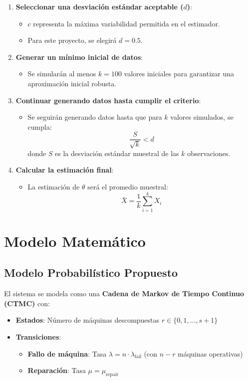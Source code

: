 \documentclass[a4paper, 12pt]{article}
\begin{document}
\begin{enumerate}
    \item \textbf{Seleccionar una desviación estándar aceptable (\(d\))}:
    \begin{itemize}
        \item \(c\) representa la máxima variabilidad permitida en el estimador.
        \item Para este proyecto, se elegirá \(d = 0.5\). 
    \end{itemize}
    
    \item \textbf{Generar un mínimo inicial de datos}:
    \begin{itemize}
        \item Se simularán al menos \(k = 100\) valores iniciales para garantizar una aproximación inicial robusta.
    \end{itemize}
    
    \item \textbf{Continuar generando datos hasta cumplir el criterio}:
    \begin{itemize}
        \item Se seguirán generando datos hasta que para \(k\) valores simulados, se cumpla:
        \[
        \frac{S}{\sqrt{k}} < d
        \]
        donde \(S\) es la desviación estándar muestral de las \(k\) observaciones.
    \end{itemize}
    
    \item \textbf{Calcular la estimación final}:
    \begin{itemize}
        \item La estimación de \(\theta\) será el promedio muestral:
        \[
        \bar{X} = \frac{1}{k} \sum_{i=1}^k X_i
        \]
    \end{itemize}
\end{enumerate}



\newpage
\section{Modelo Matemático}
\subsection{Modelo Probabilístico Propuesto}
El sistema se modela como una \textbf{Cadena de Markov de Tiempo Continuo (CTMC)} con:
\begin{itemize}
    \item \textbf{Estados}: Número de máquinas descompuestas \( r \in \{0, 1, \ldots, s+1\} \)
    \item \textbf{Transiciones}:
    \begin{itemize}
        \item \textbf{Fallo de máquina}: Tasa \( \lambda = n \cdot \lambda_{\text{fail}} \) (con \( n - r \) máquinas operativas)
        \item \textbf{Reparación}: Tasa \( \mu = \mu_{\text{repair}} \)
    \end{itemize}
\end{itemize}
\end{document}
